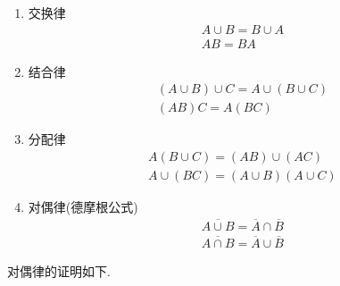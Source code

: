 \begin{property}
    \begin{enumerate}
        \item 交换律
        $$
        \begin{gathered}
            A \cup B = B \cup A \\
            AB=BA
        \end{gathered}
        $$
        \item 结合律
        $$
        \begin{gathered}
            (A \cup B) \cup C = A \cup (B \cup C) \\
            (AB)C=A(BC)
        \end{gathered}
        $$
        \item 分配律
        $$
        \begin{gathered}
            A(B \cup C) = (AB) \cup (AC) \\
            A \cup (BC) = (A \cup B)(A \cup C)
        \end{gathered}
        $$
        \item 对偶律(德摩根公式)
        $$
        \begin{gathered}
            \overline{A \cup B} = \overline{A} \cap \overline{B} \\
            \overline{A \cap B} = \overline{A} \cup \overline{B}
        \end{gathered}
        $$
    \end{enumerate}
\end{property}

对偶律的证明如下.

